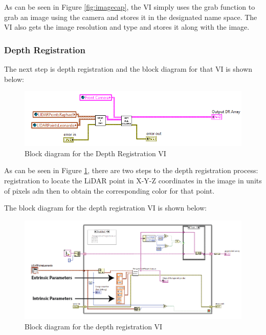 \noindent As can be seen in Figure \ref{fig:imagecap}, the VI simply uses the grab function to grab an image using the camera and stores it in the designated name space. The VI also gets the image resolution and type and stores it along with the image.

\subsubsection{Depth Registration}
The next step is depth registration and the block diagram for that VI is shown below:

\begin{figure}[h!]
\centering
\includegraphics[scale=0.75]{Photos/depthreg.png}
\caption{Block diagram for the Depth Registration VI}
\label{fig:depthreg}
\end{figure}

\noindent As can be seen in Figure \ref{fig:depthreg}, there are two steps to the depth registration process: registration to locate the LiDAR point in X-Y-Z coordinates in the image in units of pixels adn then to obtain the corresponding color for that point.

\newpage

\noindent The block diagram for the depth registration VI is shown below:

\begin{figure}[h!]
\centering
\includegraphics[scale=0.45]{Photos/lidar2cam_annotated.png}
\caption{Block diagram for the depth registration VI}
\label{fig:lidar2cam}
\end{figure}

